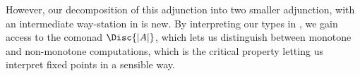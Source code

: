 However, our decomposition of this adjunction into two smaller
adjunction, with an intermediate way-station in \cPoset is new. By
interpreting our types in \cPoset, we gain access to the comonad
$\Disc{|A|}$, which lets us distinguish between monotone and
non-monotone computations, which is the critical property letting us
interpret fixed points in a sensible way. 


